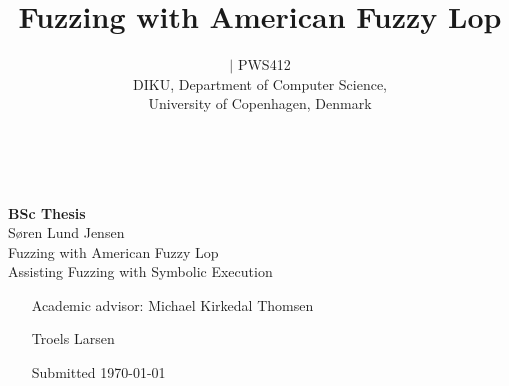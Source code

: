 \documentclass[a4paper]{article}
\title{Fuzzing with American Fuzzy Lop\\
\tbf{Assisting Fuzzing with Symbolic Execution}}
\author{\tbf{Søren Lund Jensen} $|$ PWS412\\
DIKU, Department of Computer Science,\\
University of Copenhagen, Denmark}
\newcommand{\tbf}[1]{\textbf{#1}}
\newenvironment{bottompar}{\par\vspace*{\fill}}{\clearpage}
\begin{document}

\ \vspace{3.4cm}
\begin{addmargin}[-2.5cm]{0cm}
{\large \tbf{BSc Thesis}}\\[0.2cm]
{\large Søren Lund Jensen}\\[0.9cm]
{\LARGE Fuzzing with American Fuzzy Lop}\\[0.2cm]
{\large Assisting Fuzzing with Symbolic Execution}
\end{addmargin}

\begin{bottompar}
	\begin{itemize}[noitemsep]
	   \item[Academic advisor:] Michael Kirkedal Thomsen
	                   \item[ ] Troels Larsen
	           \item[Submitted] \today
	\end{itemize}
\end{bottompar}
\end{document}
